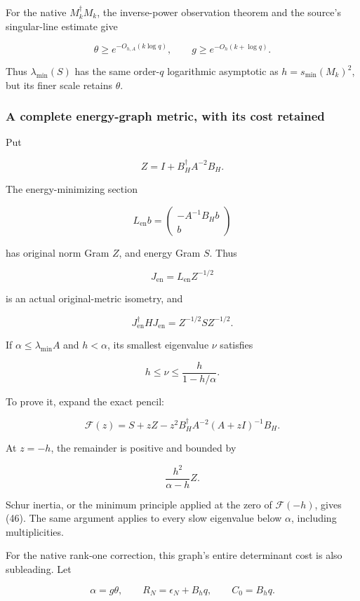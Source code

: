\documentclass[11pt]{article}
\begin{document}
For the native \(M_k^\dagger M_k\), the inverse-power observation theorem and the source's singular-line estimate give

\[
\theta\ge e^{-O_{h,A}(k\log q)},
\qquad
g\ge e^{-O_h(k+\log q)}.
\]

Thus \(\lambda_{\min}(S)\) has the same order-\(q\) logarithmic asymptotic as \(h=s_{\min}(M_k)^2\), but its finer scale retains \(\theta\).

\subsubsection{A complete energy-graph metric, with its cost retained}\label{a-complete-energy-graph-metric-with-its-cost-retained}

Put

\[
Z=I+B_H^\dagger A^{-2}B_H.
\]

The energy-minimizing section

\[
L_{\mathrm{en}}b=
\begin{pmatrix}-A^{-1}B_Hb\\b\end{pmatrix}
\]

has original norm Gram \(Z\), and energy Gram \(S\). Thus

\[
J_{\mathrm{en}}=L_{\mathrm{en}}Z^{-1/2}
\]

is an actual original-metric isometry, and

\[
J_{\mathrm{en}}^\dagger HJ_{\mathrm{en}}
=Z^{-1/2}SZ^{-1/2}.
\tag{45}
\]

If \(\alpha\le\lambda_{\min}A\) and \(h<\alpha\), its smallest eigenvalue \(\nu\) satisfies

\[
\boxed{
h\le\nu\le\frac{h}{1-h/\alpha}.
}
\tag{46}
\]

To prove it, expand the exact pencil:

\[
\mathcal F(z)
=S+zZ-z^2B_H^\dagger A^{-2}(A+zI)^{-1}B_H.
\]

At \(z=-h\), the remainder is positive and bounded by

\[
\frac{h^2}{\alpha-h}Z.
\]

Schur inertia, or the minimum principle applied at the zero of \(\mathcal F(-h)\), gives (46). The same argument applies to every slow eigenvalue below \(\alpha\), including multiplicities.

For the native rank-one correction, this graph's entire determinant cost is also subleading. Let

\[
\alpha=g\theta,\qquad R_N=\epsilon_N+B_hq,\qquad C_0=B_hq.
\]
\end{document}
